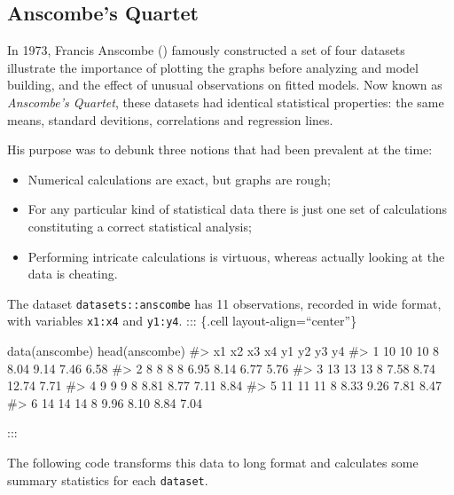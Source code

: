 \documentclass[
  letterpaper,
  10pt,
  krantz2]{krantz}
\makeatletter
\newenvironment{Shaded}{\begin{snugshade}}{\end{snugshade}}
\newcommand{\CommentTok}[1]{\textcolor[rgb]{0.37,0.37,0.37}{#1}}
\newcommand{\FunctionTok}[1]{\textcolor[rgb]{0.28,0.35,0.67}{#1}}
\newcommand{\NormalTok}[1]{\textcolor[rgb]{0.00,0.23,0.31}{#1}}
\providecommand{\tightlist}{%
  \setlength{\itemsep}{0pt}\setlength{\parskip}{0pt}}\usepackage{longtable,booktabs,array}
\newenvironment{kframe}{%
  \medskip{}
  \setlength{\fboxsep}{.8em}
  \def\at@end@of@kframe{}%
  \ifinner\ifhmode%
  \def\at@end@of@kframe{\end{minipage}}%
  \begin{minipage}{\columnwidth}%
  \fi\fi%
  \def\FrameCommand##1{\hskip\@totalleftmargin \hskip-\fboxsep
  \colorbox{shadecolor}{##1}\hskip-\fboxsep
      \hskip-\linewidth \hskip-\@totalleftmargin \hskip\columnwidth}%
  \MakeFramed {\advance\hsize-\width
    \@totalleftmargin\z@ \linewidth\hsize
    \@setminipage}}%
{\par\unskip\endMakeFramed%
  \at@end@of@kframe}
\renewenvironment{Shaded}{\begin{kframe}}{\end{kframe}}
\makeatother
\begin{document}
\subsection{Anscombe's Quartet}\label{sec-anscombe}

In 1973, Francis Anscombe ()
famously constructed a set of four datasets illustrate the importance of
plotting the graphs before analyzing and model building, and the effect
of unusual observations on fitted models. Now known as \emph{Anscombe's
Quartet}, these datasets had identical statistical properties: the same
means, standard devitions, correlations and regression lines.

His purpose was to debunk three notions that had been prevalent at the
time:

\begin{itemize}
\tightlist
\item
  Numerical calculations are exact, but graphs are rough;
\item
  For any particular kind of statistical data there is just one set of
  calculations constituting a correct statistical analysis;
\item
  Performing intricate calculations is virtuous, whereas actually
  looking at the data is cheating.
\end{itemize}

The dataset \texttt{datasets::anscombe} has 11 observations, recorded in
wide format, with variables \texttt{x1:x4} and \texttt{y1:y4}. :::
\{.cell layout-align=``center''\}

\begin{Shaded}
\begin{Highlighting}[]
\FunctionTok{data}\NormalTok{(anscombe) }
\FunctionTok{head}\NormalTok{(anscombe)}
\CommentTok{\#\textgreater{}   x1 x2 x3 x4   y1   y2    y3   y4}
\CommentTok{\#\textgreater{} 1 10 10 10  8 8.04 9.14  7.46 6.58}
\CommentTok{\#\textgreater{} 2  8  8  8  8 6.95 8.14  6.77 5.76}
\CommentTok{\#\textgreater{} 3 13 13 13  8 7.58 8.74 12.74 7.71}
\CommentTok{\#\textgreater{} 4  9  9  9  8 8.81 8.77  7.11 8.84}
\CommentTok{\#\textgreater{} 5 11 11 11  8 8.33 9.26  7.81 8.47}
\CommentTok{\#\textgreater{} 6 14 14 14  8 9.96 8.10  8.84 7.04}
\end{Highlighting}
\end{Shaded}

:::

The following code transforms this data to long format and calculates
some summary statistics for each \texttt{dataset}.
\end{document}
